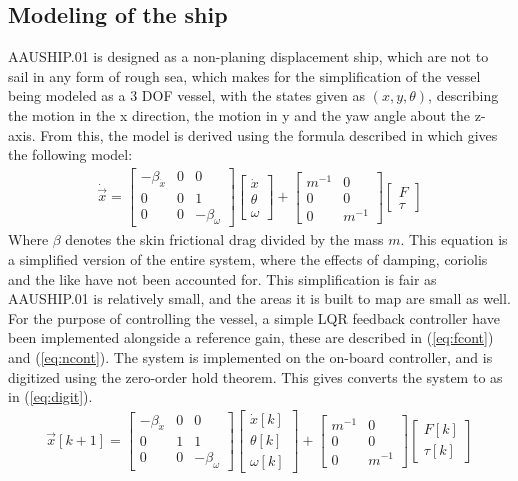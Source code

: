 \documentclass{ifacconf}
\begin{document}
\subsection{Modeling of the ship}

AAUSHIP.01 is designed as a non-planing displacement ship, which are not to sail in any form of rough sea, which makes for the simplification of the vessel being modeled as a 3 DOF vessel, with the states given as $(x,y,\theta)$, describing the motion in the x direction, the motion in y and the yaw angle about the z-axis. From this, the model is derived using the formula described in \cite{cyber} which gives the following model:
\begin{align}
\dot{\vec{x}} = \begin{bmatrix}
-\beta_{\dot{x}} & 0 & 0\\
0 & 0 & 1\\
0 & 0 & -\beta_{\omega} \end{bmatrix}\begin{bmatrix}
\dot{x}\\
\theta\\
\omega
\end{bmatrix} + \begin{bmatrix}
m^{-1} & 0\\
0 & 0\\
0 & m^{-1}
\end{bmatrix}\begin{bmatrix}
F\\
\tau
\end{bmatrix}
\label{eq:sscont}
\end{align}
Where $\beta$ denotes the skin frictional drag divided by the mass $m$. This equation is a simplified version of the entire system, where the effects of damping, coriolis and the like have not been accounted for. This simplification is fair as AAUSHIP.01 is relatively small, and the areas it is built to map are small as well. For the purpose of controlling the vessel, a simple LQR feedback controller have been implemented alongside a reference gain, these are described in (\ref{eq:fcont}) and (\ref{eq:ncont}). The system is implemented on the on-board controller, and is digitized using the zero-order hold theorem. This gives converts the system to as in (\ref{eq:digit}). 
\begin{align}
\vec{x}[k+1] = \begin{bmatrix}
-\beta_{\dot{x}} & 0 & 0\\
0 & 1 & 1\\
0 & 0 & -\beta_{\omega} \end{bmatrix}\begin{bmatrix}
\dot{x}[k]\\
\theta[k]\\
\omega[k]
\end{bmatrix} + \begin{bmatrix}
m^{-1} & 0\\
0 & 0\\
0 & m^{-1}
\end{bmatrix}\begin{bmatrix}
F[k]\\
\tau[k]
\end{bmatrix}
\label{eq:digit}
\end{align}
\end{document}
